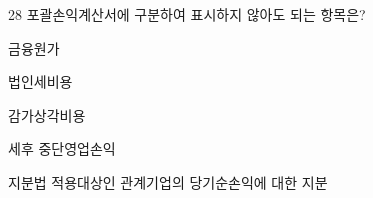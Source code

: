 \begin{question}{28}
포괄손익계산서에 구분하여 표시하지 않아도 되는 항목은?
\begin{choices}
  \item 금융원가
  \item 법인세비용
  \item 감가상각비용
  \item 세후 중단영업손익
  \item 지분법 적용대상인 관계기업의 당기순손익에 대한 지분
\end{choices}
\end{question}
